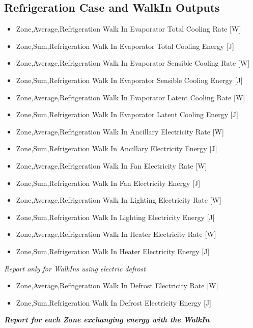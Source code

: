 \subsection{Refrigeration Case and WalkIn Outputs}\label{refrigeration-case-and-walkin-outputs}

\begin{itemize}
\item
  Zone,Average,Refrigeration Walk In Evaporator Total Cooling Rate {[}W{]}
\item
  Zone,Sum,Refrigeration Walk In Evaporator Total Cooling Energy {[}J{]}
\item
  Zone,Average,Refrigeration Walk In Evaporator Sensible Cooling Rate {[}W{]}
\item
  Zone,Sum,Refrigeration Walk In Evaporator Sensible Cooling Energy {[}J{]}
\item
  Zone,Average,Refrigeration Walk In Evaporator Latent Cooling Rate {[}W{]}
\item
  Zone,Sum,Refrigeration Walk In Evaporator Latent Cooling Energy {[}J{]}
\item
  Zone,Average,Refrigeration Walk In Ancillary Electricity Rate {[}W{]}
\item
  Zone,Sum,Refrigeration Walk In Ancillary Electricity Energy {[}J{]}
\item
  Zone,Average,Refrigeration Walk In Fan Electricity Rate {[}W{]}
\item
  Zone,Sum,Refrigeration Walk In Fan Electricity Energy {[}J{]}
\item
  Zone,Average,Refrigeration Walk In Lighting Electricity Rate {[}W{]}
\item
  Zone,Sum,Refrigeration Walk In Lighting Electricity Energy {[}J{]}
\item
  Zone,Average,Refrigeration Walk In Heater Electricity Rate {[}W{]}
\item
  Zone,Sum,Refrigeration Walk In Heater Electricity Energy {[}J{]}
\end{itemize}

\emph{Report only for WalkIns using electric defrost}

\begin{itemize}
\item
  Zone,Average,Refrigeration Walk In Defrost Electricity Rate {[}W{]}
\item
  Zone,Sum,Refrigeration Walk In Defrost Electricity Energy {[}J{]}
\end{itemize}

\textbf{\emph{Report for each Zone exchanging energy with the WalkIn}}

